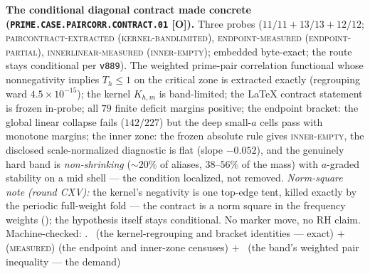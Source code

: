 \par\smallskip\noindent\textbf{The conditional diagonal
contract made concrete
(\texttt{PRIME.CASE.PAIRCORR.\allowbreak CONTRACT.01} [O]).}
Three probes ($11/11 + 13/13 + 12/12$;
\textsc{paircontract-extracted (kernel-bandlimited)},
\textsc{endpoint-measured (endpoint-partial)},
\textsc{innerlinear-measured (inner-empty)}; embedded
byte-exact; the route stays conditional per \texttt{v889}).
The weighted prime-pair correlation functional whose
nonnegativity implies $T_h \le 1$ on the critical zone is
extracted exactly (regrouping ward $4.5\times10^{-15}$); the
kernel $K_{h,m}$ is band-limited; the LaTeX contract statement
is frozen in-probe; all $79$ finite deficit margins positive;
the endpoint bracket: the global linear collapse fails
($142/227$) but the deep small-$a$ cells pass with monotone
margins; the inner zone: the frozen absolute rule gives
\textsc{inner-empty}, the disclosed scale-normalized
diagnostic is flat (slope $-0.052$), and the genuinely hard
band is \emph{non-shrinking} (${\sim}20\%$ of aliases,
$38$--$56\%$ of the mass) with $a$-graded stability on a mid
shell --- the condition localized, not removed.  \emph{Norm-square
note (round CXV):} the kernel's negativity is one top-edge tent,
killed exactly by the periodic full-weight fold --- the contract
is a norm square in the frequency weights
(); the hypothesis itself
stays conditional.  No marker
move, no RH claim.
Machine-checked: .
\mE\ (the kernel-regrouping and bracket identities --- exact)
$+$ (\textsc{measured}) (the endpoint and inner-zone censuses)
$+$ \mO\ (the band's weighted pair inequality --- the demand)
\par\smallskip


